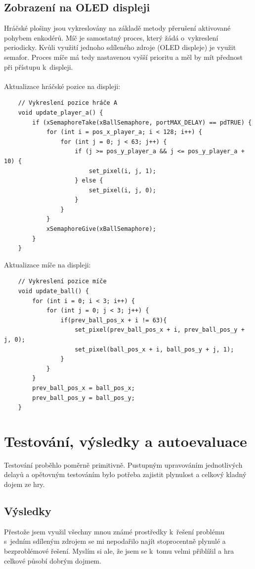 \documentclass[a4paper,11pt]{article}
\begin{document}
\subsection{Zobrazení na OLED displeji}
Hráčské plošiny jsou vykreslovány na základě metody přerušení aktivované pohybem enkodérů.
Míč je samostatný proces, který žádá o~vykreslení periodicky.
Kvůli využití jednoho sdíleného zdroje (OLED displeje) je využit semafor.
Proces míče má tedy nastavenou vyšší prioritu a měl by mít přednost při přístupu k~displeji.
\\ \\ \noindent
Aktualizace hráčské pozice na displeji:
\begin{verbatim}
    // Vykreslení pozice hráče A
    void update_player_a() {
        if (xSemaphoreTake(xBallSemaphore, portMAX_DELAY) == pdTRUE) {
            for (int i = pos_x_player_a; i < 128; i++) {
                for (int j = 0; j < 63; j++) {
                    if (j >= pos_y_player_a && j <= pos_y_player_a + 10) {
                        set_pixel(i, j, 1);
                    } else {
                        set_pixel(i, j, 0);
                    } 
                }
            }
            xSemaphoreGive(xBallSemaphore);
        }
    }
\end{verbatim}

Aktualizace míče na displeji:
\begin{verbatim}
    // Vykreslení pozice míče
    void update_ball() {
        for (int i = 0; i < 3; i++) {
            for (int j = 0; j < 3; j++) {
                if(prev_ball_pos_x + i != 63){
                    set_pixel(prev_ball_pos_x + i, prev_ball_pos_y + j, 0);
                    set_pixel(ball_pos_x + i, ball_pos_y + j, 1);
                }
            }
        }
        prev_ball_pos_x = ball_pos_x;
        prev_ball_pos_y = ball_pos_y;
    }
\end{verbatim}


\section{Testování, výsledky a autoevaluace}
Testování proběhlo poměrně primitivně. Pustupným upravováním jednotlivých delayů a opětovným testováním bylo potřeba zajistit plynulost a celkový kladný dojem ze hry.

\subsection{Výsledky}
Přestože jsem využil všechny mnou známé prostředky k~řešení problému s~jedním sdíleným zdrojem se mi nepodařilo najít stoprocentně plynulé a bezproblémové řešení.
Myslím si ale, že jsem se k~tomu velmi přiblížil a hra celkové působí dobrým dojmem.
\end{document}
